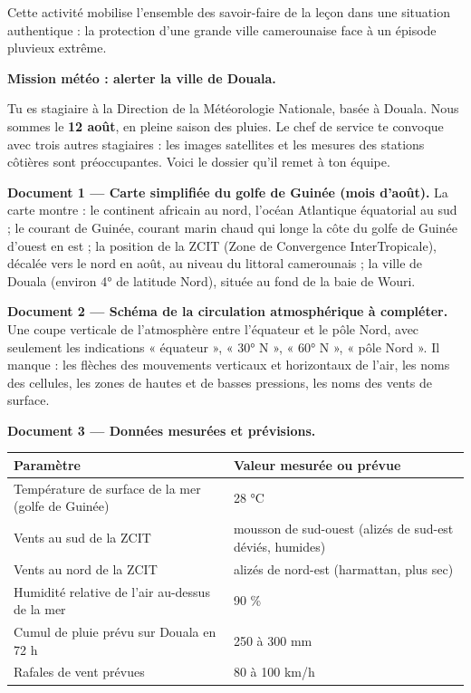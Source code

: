 \documentclass[11pt]{article}
\newcommand{\cle}[1]{{\popxbold\color{popdark}#1}}
\newcounter{popsec}
\newcounter{popsub}
\newcommand{\courssub}[1]{%
  \stepcounter{popsub}%
  \par\vspace{9pt}\noindent{\popxbold\fontsize{11.5}{13}\selectfont\color{popink}{\color{poporange}\thepopsec.\thepopsub}\hspace{6pt}#1}\par\nopagebreak\vspace{4pt}
}
\begin{document}
Cette activité mobilise l'ensemble des savoir-faire de la leçon dans une \cle{situation authentique} : la protection d'une grande ville camerounaise face à un épisode pluvieux extrême.

\courssub{Situation}

\textbf{Mission météo : alerter la ville de Douala.}

Tu es stagiaire à la Direction de la Météorologie Nationale, basée à Douala. Nous sommes le \textbf{12 août}, en pleine saison des pluies. Le chef de service te convoque avec trois autres stagiaires : les images satellites et les mesures des stations côtières sont préoccupantes. Voici le dossier qu'il remet à ton équipe.

\textbf{Document 1 — Carte simplifiée du golfe de Guinée (mois d'août).} La carte montre : le continent africain au nord, l'océan Atlantique équatorial au sud ; le \cle{courant de Guinée}, courant marin chaud qui longe la côte du golfe de Guinée d'ouest en est ; la position de la \cle{ZCIT} (Zone de Convergence InterTropicale), décalée vers le nord en août, au niveau du littoral camerounais ; la ville de Douala (environ 4° de latitude Nord), située au fond de la baie de Wouri.

\textbf{Document 2 — Schéma de la circulation atmosphérique à compléter.} Une coupe verticale de l'atmosphère entre l'équateur et le pôle Nord, avec seulement les indications « équateur », « 30° N », « 60° N », « pôle Nord ». Il manque : les flèches des mouvements verticaux et horizontaux de l'air, les noms des cellules, les zones de hautes et de basses pressions, les noms des vents de surface.

\textbf{Document 3 — Données mesurées et prévisions.}

\begin{center}
\begin{tabularx}{\linewidth}{|l|X|}\hline
\rowcolor{popblueL} \textbf{Paramètre} & \textbf{Valeur mesurée ou prévue} \\ \hline
Température de surface de la mer (golfe de Guinée) & 28 °C \\ \hline
Vents au sud de la ZCIT & mousson de sud-ouest (alizés de sud-est déviés, humides) \\ \hline
Vents au nord de la ZCIT & alizés de nord-est (harmattan, plus sec) \\ \hline
Humidité relative de l'air au-dessus de la mer & 90 \% \\ \hline
Cumul de pluie prévu sur Douala en 72 h & 250 à 300 mm \\ \hline
Rafales de vent prévues & 80 à 100 km/h \\ \hline
\end{tabularx}
\end{center}
\end{document}
